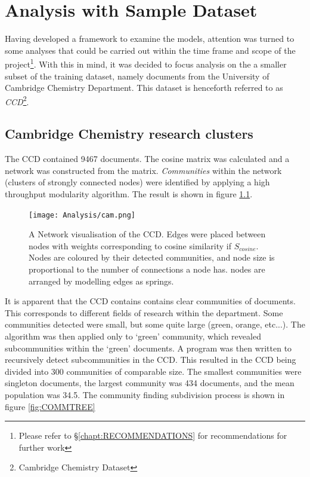 \chapter{Analysis with Sample Dataset}
Having developed a framework to examine the models, attention was turned to some analyses that could be carried out within the time frame and scope of the project\footnote{Please refer to  \S\ref{chapt:RECOMMENDATIONS} for recommendations for further work}. With this in mind, it was decided to focus analysis on the a smaller subset of the training dataset, namely documents from the University of Cambridge Chemistry Department. This dataset is henceforth referred to as \emph{CCD}\footnote{Cambridge Chemistry Dataset}.
\section{Cambridge Chemistry research clusters}
\label{sec:RESEARCHCLUSTERS}
The CCD contained 9467 documents. The cosine matrix was calculated and a network was constructed from the matrix. \emph{Communities} within the network (clusters of strongly connected nodes) were identified by applying a high throughput modularity algorithm\cite{modularity1}\cite{modularity2}. The result is shown in figure \ref{fig:CAMCOMMUNITIES}.
\begin{center}
\begin{figure}[H]
  \centering
    \texttt{[image: Analysis/cam.png]}
    \caption{A Network visualisation of the CCD. Edges were placed between nodes with weights corresponding to cosine similarity if $S_{cosine}$. Nodes are coloured by their detected communities, and node size is proportional to the number of connections a node has. nodes are arranged by modelling edges as springs.}
    \label{fig:CAMCOMMUNITIES}

\end{figure} 
\end{center}
It is apparent that the CCD contains contains clear communities of documents. This corresponds to different fields of research within the department. Some communities detected were small, but some quite large (green, orange, etc...). The algorithm was then applied only to `green' community, which revealed subcommunities within the `green' documents. A program was then written to recursively detect subcommunities in the CCD. This resulted in the CCD being divided into 300 communities of comparable size. The smallest communities were singleton documents, the largest community was 434 documents, and the mean population was 34.5. The community finding subdivision process is shown in figure \ref{fig:COMMTREE}

